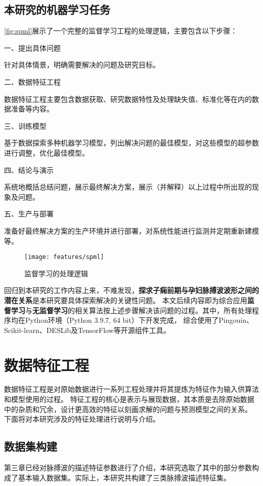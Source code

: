 \subsection{本研究的机器学习任务}
\autoref{fig:spml}展示了一个完整的监督学习工程的处理逻辑，主要包含以下步骤\cite{Aurélien2018}：

一、提出具体问题

针对具体情景，明确需要解决的问题及研究目标。

二、数据特征工程

数据特征工程主要包含数据获取、研究数据特性及处理缺失值、标准化等在内的数据准备等内容。

三、训练模型

基于数据探索多种机器学习模型，列出解决问题的最佳模型，对这些模型的超参数进行调整，优化最佳模型。

四、结论与演示

系统地概括总结问题，展示最终解决方案，展示（并解释）以上过程中所出现的现象及问题。

五、生产与部署

准备好最终解决方案的生产环境并进行部署，对系统性能进行监测并定期重新建模等。
\begin{figure}[htbp]
  \centering
  \texttt{[image: features/spml]}
  \caption[监督学习的处理逻辑]{\label{fig:spml}监督学习的处理逻辑\cite{awad2015}}
\end{figure}

回归到本研究的工作内容上来，不难发现，\textbf{探求子痫前期与孕妇脉搏波波形之间的潜在关系}是本研究要具体探索解决的关键性问题。
本文后续内容即为综合应用\textbf{监督学习}与\textbf{无监督学习}的相关算法按上述步骤解决该问题的过程。其中，所有处理程序均在Python环境（Python 3.9.7, 64 bit）下开发完成，
综合使用了Pingouin、Scikit-learn、DESLib及TensorFlow等开源组件工具\cite{python,Vallat2018,scikit-learn,JMLR:v21:18-144,tensorflow2015-whitepaper}。

\section{数据特征工程}
数据特征工程是对原始数据进行一系列工程处理并将其提炼为特征作为输入供算法和模型使用的过程\cite{Zhou2016,Aurélien2018}。
特征工程的核心是表示与展现数据，其本质是去除原始数据中的杂质和冗余，设计更高效的特征以刻画求解的问题与预测模型之间的关系。
下面将对本研究涉及的特征处理进行说明与介绍。

\subsection{数据集构建}
第三章已经对脉搏波的描述特征参数进行了介绍，本研究选取了其中的部分参数构成了基本输入数据集。实际上，本研究共构建了三类脉搏波描述特征集。

